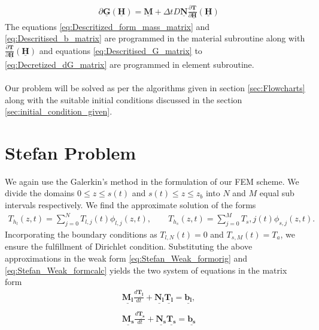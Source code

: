 \begin{subequations}
\begin{align}
&\partial \underline{\mathbf{G}}(\underline{\mathbf{H}}) = \underline{\mathbf{M}}+\Delta t D \underline{\mathbf{N}} \frac{\partial{\underline{\mathbf{T}}}}{\partial{\underline{\mathbf{H}}}}(\underline{\mathbf{H}}) \label{eq:Decretized_dG_matrix}
\end{align}
\end{subequations}
The equations \ref{eq:Descritized_form_mass_matrix} and \ref{eq:Descritised_b_matrix} are programmed in the material subroutine along with $\frac{\partial \underline{\mathbf{T}}}{\partial \underline{\mathbf{H}}}(\underline{\mathbf{H}})$ and equations \ref{eq:Descritised_G_matrix} to \ref{eq:Decretized_dG_matrix} are programmed in element subroutine.\\ \\
Our problem will be solved as per the algorithms given in section \ref{sec:Flowcharts} along with the suitable initial conditions discussed in the section \ref{sec:initial_condition_given}.
\section{Stefan Problem\label{sec:Stefan_solution}}
We again use the Galerkin's method\cite{galerkin1915series} in the formulation of our FEM scheme.
We divide the domains $0 \leq z \leq s(t)$ and $s(t) \leq z \leq z_b$ into $N$ and $M$ equal sub intervals respectively. We find the approximate solution of the forms
\begin{subequations}
    \begin{align}
        T_{h_l}(z,t) = \sum_{j = 0}^{N} T_{l,j}(t)\phi_{l,j}(z,t), \quad\quad T_{h_s}(z,t) = \sum_{j=0}^M T_s,j(t)\phi_{s,j}(z,t).
    \end{align}
\end{subequations}
Incorporating the boundary conditions as $T_{l,N}(t) = 0$ and $T_{s,M}(t) = T_a$, we ensure the fulfillment of Dirichlet condition. Substituting the above approximations in the weak form \eqref{eq:Stefan_Weak_formorig} and \eqref{eq:Stefan_Weak_formcalc} yields the two system of equations in the matrix form 
\begin{subequations}
    \begin{align}
        &\underline{\mathbf{M_l}}\frac{d \underline{\mathbf{T_l}}}{dt} + \underline{\mathbf{N_l}}\underline{\mathbf{T_l}} = \underline{\mathbf{b_l}} \label{eq:descretised_stefan1},\\
        \nonumber \\
        &\underline{\mathbf{M_s}}\frac{d \underline{\mathbf{T_s}}}{dt} + \underline{\mathbf{N_s}}\underline{\mathbf{T_s}} = \underline{\mathbf{b_s}} \label{eq:Descritised_stefan2}
    \end{align}
\end{subequations}

